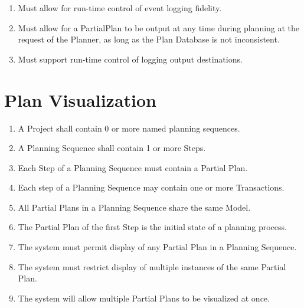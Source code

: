 \documentclass[twoside, 11pt]{article}
\begin{document}
\begin{enumerate}
\item Must allow for run-time control of event logging fidelity.
\item Must allow for a PartialPlan to be output at any time during planning at the request of the Planner, as long as the Plan Database is not inconsistent.
\item Must support run-time control of logging output destinations.
\end{enumerate}

\section{Plan Visualization}
\begin{enumerate}
\item A Project shall contain 0 or more named planning sequences.
\item A Planning Sequence shall contain 1 or more Steps.
\item Each Step of a Planning Sequence must contain a Partial Plan.
\item Each step of a Planning Sequence may contain one or more Transactions.
\item All Partial Plans in a Planning Sequence share the same Model.
\item The Partial Plan of the first Step is the initial state of a planning process.
\item The system must permit display of any Partial Plan in a Planning Sequence.
\item The system must restrict display of multiple instances of the same Partial Plan.
\item The system will allow multiple Partial Plans to be visualized at once.
\end{enumerate}
\end{document}
